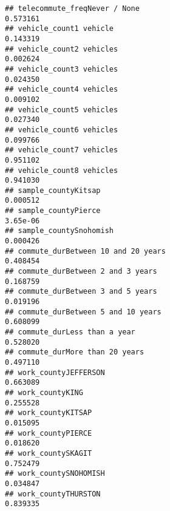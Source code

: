 \documentclass[
]{article}
\begin{document}
\begin{verbatim}
## telecommute_freqNever / None                                                                0.573161
## vehicle_count1 vehicle                                                                      0.143319
## vehicle_count2 vehicles                                                                     0.002624
## vehicle_count3 vehicles                                                                     0.024350
## vehicle_count4 vehicles                                                                     0.009102
## vehicle_count5 vehicles                                                                     0.027340
## vehicle_count6 vehicles                                                                     0.099766
## vehicle_count7 vehicles                                                                     0.951102
## vehicle_count8 vehicles                                                                     0.941030
## sample_countyKitsap                                                                         0.000512
## sample_countyPierce                                                                         3.65e-06
## sample_countySnohomish                                                                      0.000426
## commute_durBetween 10 and 20 years                                                          0.408454
## commute_durBetween 2 and 3 years                                                            0.168759
## commute_durBetween 3 and 5 years                                                            0.019196
## commute_durBetween 5 and 10 years                                                           0.608099
## commute_durLess than a year                                                                 0.528020
## commute_durMore than 20 years                                                               0.497110
## work_countyJEFFERSON                                                                        0.663089
## work_countyKING                                                                             0.255528
## work_countyKITSAP                                                                           0.015095
## work_countyPIERCE                                                                           0.018620
## work_countySKAGIT                                                                           0.752479
## work_countySNOHOMISH                                                                        0.034847
## work_countyTHURSTON                                                                         0.839335

\end{verbatim}
\end{document}
